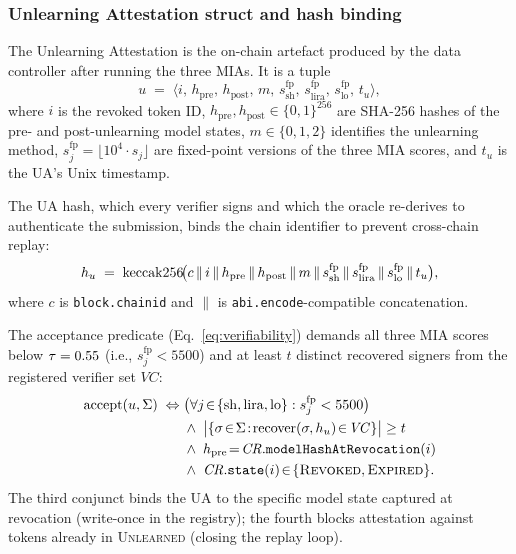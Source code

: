 \subsubsection{Unlearning Attestation struct and hash binding}

The Unlearning Attestation is the on-chain artefact produced by the
data controller after running the three MIAs. It is a tuple
\begin{equation}\label{eq:ua}
    u \;=\; \langle i,\, h_{\mathrm{pre}},\, h_{\mathrm{post}},\, m,\,
        s_{\mathrm{sh}}^{\mathrm{fp}},\, s_{\mathrm{lira}}^{\mathrm{fp}},\,
        s_{\mathrm{lo}}^{\mathrm{fp}},\, t_u \rangle,
\end{equation}
where $i$ is the revoked token ID, $h_{\mathrm{pre}}, h_{\mathrm{post}}
\in \{0,1\}^{256}$ are SHA-256 hashes of the pre- and post-unlearning
model states, $m \in \{0,1,2\}$ identifies the unlearning method,
$s^{\mathrm{fp}}_j = \lfloor 10^4 \cdot s_j \rfloor$ are fixed-point
versions of the three MIA scores, and $t_u$ is the UA's
Unix timestamp.

The UA hash, which every verifier signs and which the oracle
re-derives to authenticate the submission, binds the chain
identifier to prevent cross-chain replay:
\begin{equation}\label{eq:uahash}
    h_u \;=\; \mathrm{keccak256}\!\big(c \,\|\, i \,\|\, h_{\mathrm{pre}}
        \,\|\, h_{\mathrm{post}} \,\|\, m \,\|\,
        s_{\mathrm{sh}}^{\mathrm{fp}} \,\|\, s_{\mathrm{lira}}^{\mathrm{fp}}
        \,\|\, s_{\mathrm{lo}}^{\mathrm{fp}} \,\|\, t_u\big),
\end{equation}
where $c$ is \texttt{block.chainid} and $\|$ is
\texttt{abi.encode}-compatible concatenation.

The acceptance predicate
(Eq.~\ref{eq:verifiability}) demands all three MIA scores below
$\tau = 0.55$ (i.e., $s^{\mathrm{fp}}_j < 5500$) and at least $t$
distinct recovered signers from the registered verifier set $\mathit{VC}$:
\begin{equation}\label{eq:accept}
\begin{aligned}
    \mathrm{accept}(u, \Sigma) \;\Leftrightarrow\;
    &\big(\forall j\!\in\!\{\mathrm{sh}, \mathrm{lira}, \mathrm{lo}\}:
        s^{\mathrm{fp}}_j < 5500\big) \\
    &\wedge\;
    \big|\{\sigma\!\in\!\Sigma\!:\!\mathrm{recover}(\sigma, h_u)\!\in\!\mathit{VC}\}\big| \ge t \\
    &\wedge\; h_{\mathrm{pre}}\!=\!\mathit{CR}.\mathtt{modelHashAtRevocation}(i) \\
    &\wedge\; \mathit{CR}.\mathtt{state}(i)\!\in\!\{\textsc{Revoked},\textsc{Expired}\}.
\end{aligned}
\end{equation}
The third conjunct binds the UA to the specific model state captured
at revocation (write-once in the registry); the fourth blocks
attestation against tokens already in \textsc{Unlearned} (closing the
replay loop).

